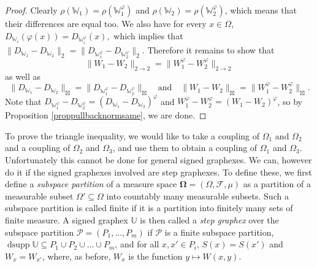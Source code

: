 \documentclass{amsart}
\numberwithin{equation}{section}
\numberwithin{figure}{section}
\theoremstyle{definition}
\theoremstyle{remark}
\newcommand{\jbl}{{\boxtimes}}
\DeclareMathOperator{\dsupp}{dsupp}
\newcommand{\bOmega}{{\mathbf{\Omega}}}
\newcommand{\cP}{\mathcal{P}}
\newcommand{\cW}{\mathbb{W}}
\newcommand{\cF}{\mathcal{F}}
\newcommand{\cU}{\mathbb{U}}
\begin{document}
\begin{proof}
Clearly $\rho(\cW_1)=\rho(\cW_1^\varphi)$ and
$\rho(\cW_2)=\rho(\cW_2^\varphi)$, which means that their differences are
equal too. We also have for every $x \in \Omega$, $
D_{\cW_i}(\varphi(x))=D_{\cW_i^\varphi}(x), $ which implies that $
\|D_{\cW_1}-D_{\cW_2}\|_2=\|D_{\cW_1^\varphi}-D_{\cW_2^\varphi}\|_2. $
Therefore it remains to show that
\[
\|W_1-W_2\|_{2 \rightarrow 2}=\|W_1^\varphi-W_2^\varphi\|_{2 \rightarrow 2}
\]
as well as
\[\|D_{\cW_1}-D_{\cW_2}\|_\jbl=\|D_{\cW_1^\varphi}-D_{\cW_2^\varphi}\|_\jbl
\quad\text{and}\quad
\|W_1-W_2\|_{\jbl}=\|W_1^\varphi-W_2^\varphi\|_{\jbl}.
\]
Note that $D_{\cW_1^\varphi}-D_{\cW_2^\varphi}=\left(D_{\cW_1}- D_{\cW_2}\right)^\varphi$
and
$W_1^\varphi-W_2^\varphi=(W_1-W_2)^\varphi$, so by Proposition
\ref{proppullbacknormsame}, we are done.
\end{proof}

To prove the triangle inequality, we would like to take a coupling of
$\Omega_1$ and $\Omega_2$ and a coupling of $\Omega_2$ and $\Omega_3$, and
use them to obtain a coupling of $\Omega_1$ and $\Omega_3$. Unfortunately
this cannot be done for general signed graphexes. We can, however do it if
the signed graphexes involved are step graphexes. To define these, we first
define a \emph{subspace partition} of a measure space
$\bOmega=(\Omega,\cF,\mu)$ as a partition of a measurable subset
$\Omega'\subseteq\Omega$ into countably many measurable subsets. Such a
subspace partition is called finite if it is a partition into finitely many
sets of finite measure. A signed graphex $\cU$ is then called a \emph{step
graphex} over the subspace partition $\cP=(P_1, \dots, P_m)$ if $\cP$ is a
finite subspace partition, $\dsupp \cU\subseteq P_1 \cup P_2 \cup \dots \cup
P_m$, and for all $x,x' \in P_i$, $S(x)=S(x')$ and $W_x=W_{x'}$, where, as
before, $W_x$ is the function $y\mapsto W(x,y)$.
\end{document}
